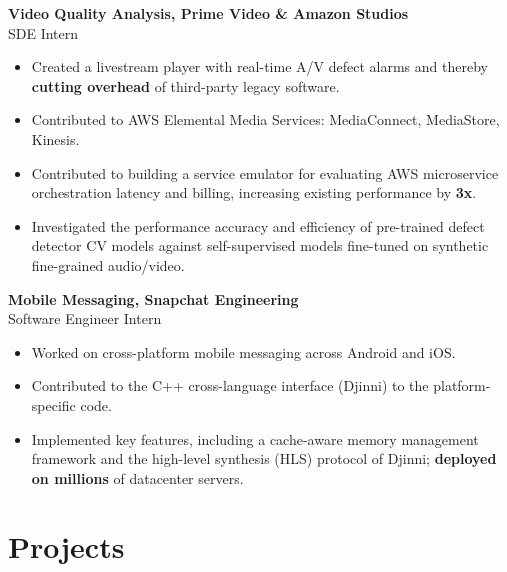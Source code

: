 \documentclass[11pt,a4paper]{article}
\newcommand{\years}[1]{\marginnote{\footnotesize\myfont #1}} %
\begin{document}
    \years{2021-21} \textbf{Video Quality Analysis, Prime Video \& Amazon Studios} \\
    SDE Intern \vspace{1pt}
    \begin{itemize}[itemsep=-1mm,topsep=0pt,partopsep=0pt,leftmargin=5mm]
     \item Created a livestream player with real-time A/V defect alarms and thereby \textbf{cutting overhead} of third-party legacy software.
     \item Contributed to AWS Elemental Media Services: MediaConnect, MediaStore, Kinesis.
     \item Contributed to building a service emulator for evaluating AWS microservice orchestration latency and billing, increasing existing performance by \textbf{3x}.
     \item Investigated the performance accuracy and efficiency of pre-trained defect detector CV models against self-supervised models fine-tuned on synthetic fine-grained audio/video.\medskip
    \end{itemize}
    \years{2020-2020} \textbf{Mobile Messaging, Snapchat Engineering} \\
    Software Engineer Intern \vspace{1pt}
    \begin{itemize}[itemsep=-1mm,topsep=0pt,partopsep=0pt,leftmargin=5mm]
     \item Worked on cross-platform mobile messaging across Android and iOS.
     \item Contributed to the C++ cross-language interface (Djinni) to the platform-specific code.
     \item Implemented key features, including a cache-aware memory management framework and the high-level synthesis (HLS) protocol of Djinni; \textbf{deployed on millions} of datacenter servers.
    \end{itemize}

    \section{Projects}
\end{document}
